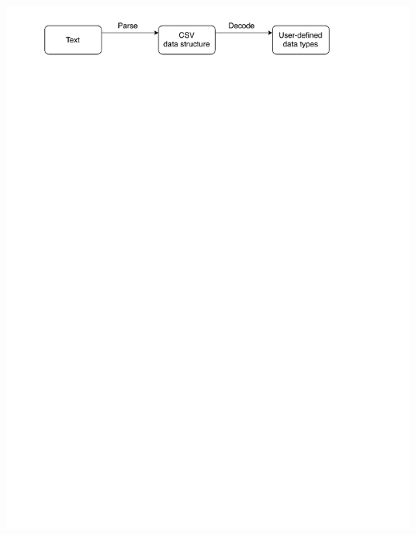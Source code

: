 \documentclass[UKenglish,usenames,dvipsnames,svgnames,table,aspectratio=169,mathserif]{beamer}
\newcommand{\nl}{\vspace{\baselineskip}}
\begin{document}
\begin{frame}
\centering \nl \nl \nl \nl \nl
\includegraphics[scale=0.8]{diagrams/parsedecodeencodeprint1.pdf}
\end{frame}
\end{document}
